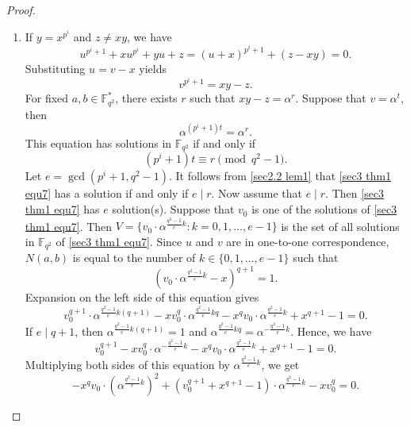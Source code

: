 \documentclass[sn-mathphys-num]{sn-jnl}%
\theoremstyle{thmstyleone}%
\theoremstyle{thmstyletwo}%
\theoremstyle{thmstylethree}%
\begin{document}
\begin{proof}
\begin{enumerate}[label = \bf Case \arabic*:, leftmargin=4.1em]
\begin{enumerate}[label=\bf Case 3.\arabic*:]
			\item If $y= x^{p^i}$ and $z\ne xy$, we have 
			\begin{equation*}
				u^{p^i+1}+xu^{p^i}+yu+z=\left(u+x\right)^{p^i+1}+\left(z-xy\right)=0.
			\end{equation*}
			Substituting $u=v-x$ yields
			\begin{equation}\label{sec3 thm1 equ7}
				v^{p^i+1}=xy-z.
			\end{equation}
			For fixed $a,b\in\mathbb{F}_{q^2}^\ast$, there exists $r$ such that $xy-z=\alpha^r$. Suppose that $v=\alpha^t$, then 
			\begin{equation*}
				\alpha^{\left(p^i+1\right)t}=\alpha^{r}.
			\end{equation*}
			This equation has solutions in $\mathbb{F}_{q^2}$ if and only if
			\begin{equation*}
				\left(p^i+1\right)t \equiv r \pmod {q^2-1}.
			\end{equation*}
			Let $e=\gcd(p^i+1,q^2-1)$. It follows from \cref{sec2.2 lem1} that \cref{sec3 thm1 equ7} has a solution if and only if $e \mid r$. Now assume that $e \mid r$. Then \cref{sec3 thm1 equ7} has $e$ solution(s). Suppose that $v_0$ is one of the solutions of \cref{sec3 thm1 equ7}. Then $V=\{v_0\cdot\alpha^{\frac{q^2-1}{e}k} : k=0,1,\dots,e-1\}$ is the set of all solutions in $\mathbb{F}_{q^2}$ of \cref{sec3 thm1 equ7}. Since $u$ and $v$ are in one-to-one correspondence, $N(a,b)$ is equal to the number of $k \in \{0,1,\dots,e-1\}$ such that
			\begin{equation}\label{sec3 thm1 equ8}
				\left(v_0\cdot\alpha^{\frac{q^2-1}{e}k}-x\right)^{q+1}=1.
			\end{equation}
			Expansion on the left side of this equation gives
			\begin{equation}\label{sec3 thm1 equ9}
				v_0^{q+1}\cdot\alpha^{\frac{q^2-1}{e}k(q+1)}-xv_0^q\cdot\alpha^{\frac{q^2-1}{e}kq}-x^qv_0\cdot\alpha^{\frac{q^2-1}{e}k}+x^{q+1}-1=0.
			\end{equation}
			If $e \mid q+1$, then $\alpha^{\frac{q^2-1}{e}k(q+1)}=1$ and $\alpha^{\frac{q^2-1}{e}kq}=\alpha^{-\frac{q^2-1}{e}k}$. Hence, we have
			\begin{equation*}
				v_0^{q+1}-xv_0^q\cdot\alpha^{-\frac{q^2-1}{e}k}-x^qv_0\cdot\alpha^{\frac{q^2-1}{e}k}+x^{q+1}-1=0.
			\end{equation*}
			Multiplying both sides of this equation by $\alpha^{\frac{q^2-1}{e}k}$, we get
			\begin{equation}\label{sec3 thm1 equ10}
				-x^qv_0\cdot\left(\alpha^{\frac{q^2-1}{e}k}\right)^2+\left(v_0^{q+1}+x^{q+1}-1\right)\cdot\alpha^{\frac{q^2-1}{e}k}-xv_0^q=0.

\end{equation}
\end{enumerate}
\end{enumerate}
\end{proof}
\end{document}

